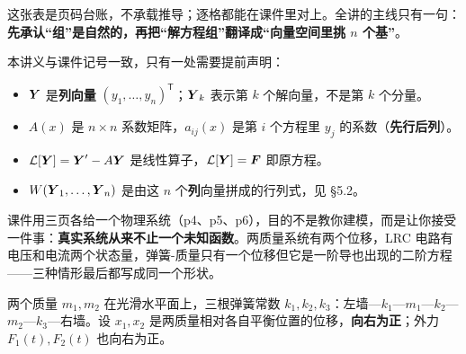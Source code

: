 \documentclass[11pt]{ctexart}
\begin{document}
这张表是页码台账，不承载推导；逐格都能在课件里对上。全讲的主线只有一句：\textbf{先承认“组”是自然的，再把“解方程组”翻译成“向量空间里挑 $n$ 个基”}。


本讲义与课件记号一致，只有一处需要提前声明：

\begin{itemize}
  \item $\boldsymbol{Y}$ 是\textbf{列向量} $(y_1,\dots,y_n)^{\mathsf T}$；$\boldsymbol{Y}_k$ 表示第 $k$ 个解向量，不是第 $k$ 个分量。
  \item $A(x)$ 是 $n\times n$ 系数矩阵，$a_{ij}(x)$ 是第 $i$ 个方程里 $y_j$ 的系数（\textbf{先行后列}）。
  \item $\mathcal{L}[\boldsymbol{Y}]=\boldsymbol{Y}'-A\boldsymbol{Y}$ 是线性算子，$\mathcal{L}[\boldsymbol{Y}]=\boldsymbol{F}$ 即原方程。
  \item $W(\boldsymbol{Y}_1,\dots,\boldsymbol{Y}_n)$ 是由这 $n$ 个\textbf{列}向量拼成的行列式，见 §5.2。
\end{itemize}


课件用三页各给一个物理系统（p4、p5、p6），目的不是教你建模，而是让你接受一件事：\textbf{真实系统从来不止一个未知函数}。两质量系统有两个位移，LRC 电路有电压和电流两个状态量，弹簧-质量只有一个位移但它是一阶导也出现的二阶方程——三种情形最后都写成同一个形状。


两个质量 $m_1,m_2$ 在光滑水平面上，三根弹簧常数 $k_1,k_2,k_3$：左墙—$k_1$—$m_1$—$k_2$—$m_2$—$k_3$—右墙。设 $x_1,x_2$ 是两质量相对各自平衡位置的位移，\textbf{向右为正}；外力 $F_1(t),F_2(t)$ 也向右为正。
\end{document}
